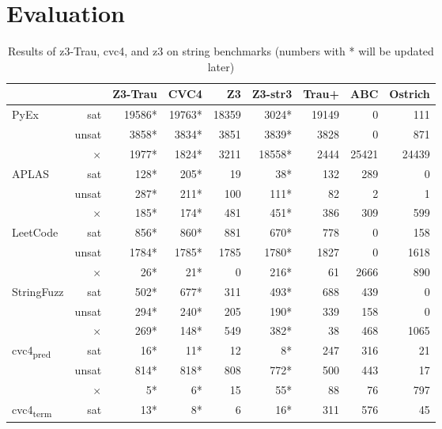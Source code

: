 \section{Evaluation}
\label{section:evaluation}



\begin{table*}[t]
\centering
\caption{Results of z3-Trau, cvc4, and z3 on string benchmarks (numbers with * will be updated later)}
\begin{tabular}{l r | r r r r r r r}
\hline
\multicolumn{2}{c}{}                   & Z3-Trau & CVC4  &    Z3 & Z3-str3 & Trau+ & ABC & Ostrich \\ \hline
\multirow{3}{*}{PyEx}		& sat      & 19586*   & 19763* & 18359 &   3024*  & 19149 & 0 & 111 \\ 
							& unsat    &  3858*   &  3834* &  3851 &   3839*  & 3828 & 0 & 871 \\
							& $\times$ &  1977*   &  1824* &  3211 &  18558*  & 2444 & 25421 & 24439 \\ \hline
\multirow{3}{*}{APLAS}		& sat      &   128*   &   205* &    19 &     38*  & 132 & 289 & 0 \\
							& unsat    &   287*   &   211* &   100 &    111*  & 82 & 2 & 1 \\
							& $\times$ &   185*   &   174* &   481 &    451*  & 386 & 309 & 599 \\ \hline
\multirow{3}{*}{LeetCode}	& sat      &   856*   &   860* &   881 &    670*  & 778 & 0 & 158 \\
							& unsat    &  1784*   &  1785* &  1785 &   1780*  & 1827 & 0 & 1618 \\
							& $\times$ &    26*   &    21* &     0 &    216*  & 61 & 2666 & 890 \\ \hline
\multirow{3}{*}{StringFuzz}	& sat      &   502*   &   677* &   311 &    493*  & 688 & 439 & 0 \\
							& unsat    &   294*   &   240* &   205 &    190*  & 339 & 158 & 0 \\
							& $\times$ &   269*   &   148* &   549 &    382*  & 38 & 468 & 1065 \\\hline
\multirow{3}{*}{cvc4\textsubscript{pred}} & sat & 16* & 11* &   12 &      8*  & 247 & 316 & 21 \\
							& unsat    &   814*   &   818* &   808 &    772*  & 500 & 443 & 17 \\
							& $\times$ &     5*   &     6* &    15 &     55*  & 88 & 76 & 797 \\ \hline
\multirow{3}{*}{cvc4\textsubscript{term}} & sat & 13* & 8* &     6 &     16*  & 311 & 576 & 45 \\

\end{tabular}
\end{table*}
